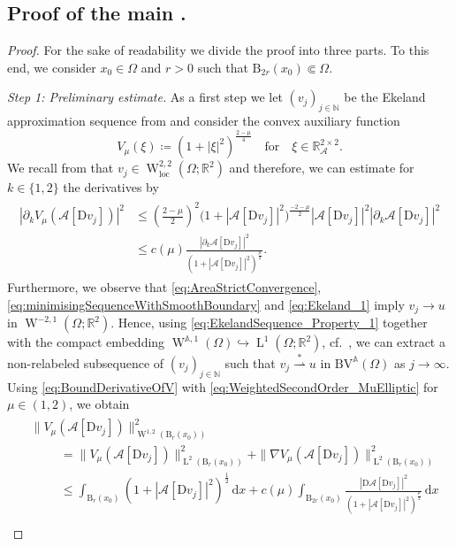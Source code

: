 \documentclass[a4paper,10pt,reqno,oneside]{amsart}
\numberwithin{equation}{section}
\newcommand{\R}{\mathbb R}
\newcommand{\N}{\mathbb N}
\newcommand{\ball}{\mathrm{B}}
\newcommand{\A}{\mathscr{A}}
\newcommand{\Aop}{\mathbb{A}}
\newcommand{\lebe}{\operatorname{L}}
\newcommand{\sobo}{\operatorname{W}}
\newcommand{\BV}{\mathrm{BV}}
\newcommand{\loc}{\mathrm{loc}}
\newcommand{\D}{\mathrm{D}}
\newcommand{\dx}[1]{\,\mathrm{d}#1}
\newcommand{\del}{\partial}
\newcommand{\abs}[1]{\left\lvert#1\right\rvert}
\newcommand{\weakstar}{\overset{\ast}{\rightharpoonup}}
\begin{document}
\subsection{Proof of the main .} 
\begin{proof}
For the sake of readability we divide the proof into three parts. To this end, we consider $x_0\in\Omega$ and $r>0$ such that $\ball_{2r}(x_0)\Subset \Omega$. 

	\textit{Step 1: Preliminary estimate.}
	As a first step we let $(v_j)_{j\in\N}$ be the Ekeland approximation sequence from  and consider the convex auxiliary function 
	\[
	V_\mu(\xi) \coloneqq (1+\abs{\xi}^2)^{\frac{2-\mu}{4}}\quad\mbox{for} \quad\xi\in\R^{2\times 2}_\A.
	\]
	We recall from  that $v_j\in \sobo^{2,2}_\loc(\Omega;\R^2)$ and therefore, we can estimate for $k\in\{1,2\}$ the derivatives by 
	\begin{align}\label{eq:BoundDerivativeOfV}
		\begin{split}
			\abs{\del_k V_\mu( \A[\D v_j])}^2 
			&\leq \left(\frac{2-\mu}{2}\right)^2 \big(1+\abs{\A[\D v_j]}^2\big)^{\frac{-2-\mu}{2}} \abs{\A[\D v_j]}^2 \abs{\del_k \A[\D v_j]}^2 \\
			&\leq c(\mu) \frac{\abs{\del_k \A[\D v_j]}^2}{(1+\abs{\A[\D v_j]}^2)^{\frac{\mu}{2}}}.
		\end{split}
	\end{align}
	Furthermore, we observe that \eqref{eq:AreaStrictConvergence}, \eqref{eq:minimisingSequenceWithSmoothBoundary} and \eqref{eq:Ekeland_1} imply  $v_j\to u$ in $\sobo^{-2,1}(\Omega;\R^2)$. Hence, using \eqref{eq:EkelandSequence_Property_1} together with the compact embedding $\sobo^{\Aop,1}(\Omega)\hookrightarrow\lebe^1(\Omega;\R^2)$, cf.~\cite[Theorem 1.1]{GmRa1}, we can extract a non-relabeled subsequence of $(v_j)_{j\in\N}$ such that $v_j\weakstar u$ in  $\BV^\Aop(\Omega)$ as $j\to\infty$. Using \eqref{eq:BoundDerivativeOfV} with \eqref{eq:WeightedSecondOrder_MuElliptic} for $\mu\in(1,2)$, we obtain
	\begin{align}\label{eq:Proof_MainTheorem1}
	\begin{split}
	&\|V_\mu(\A[\D v_j])\|^2_{\sobo^{1,2}(\ball_{r}(x_0))} \\
	& \hspace{1cm}= \|V_\mu(\A[\D v_j])\|^2_{\lebe^2(\ball_{r}(x_0))} + \|\nabla V_\mu(\A[\D v_j])\|^2_{\lebe^2(\ball_{r}(x_0))} \\
	&\hspace{1cm}\leq \int_{\ball_{r}(x_0)} (1+\abs{\A[\D v_j]}^2)^{\frac{1}{2}} \dx{x} + c(\mu) \int_{\ball_{2r}(x_0)}\frac{\abs{\D \A[\D v_j]}^2}{(1+\abs{\A[\D v_j]}^2)^{\frac{\mu}{2}}}\dx{x} \\

\end{split}
\end{align}
\end{proof}
\end{document}
